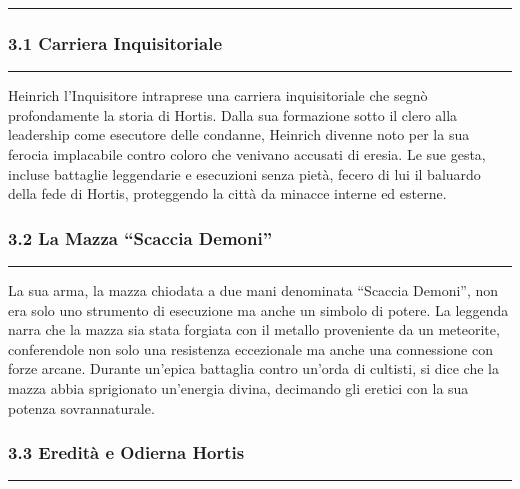 \begin{center}\rule{0.5\linewidth}{0.5pt}\end{center}

\subsubsection{\texorpdfstring{3.1 \textbf{Carriera
Inquisitoriale}}{3.1 Carriera Inquisitoriale}}\label{carriera-inquisitoriale}

\begin{center}\rule{0.5\linewidth}{0.5pt}\end{center}

Heinrich l'Inquisitore intraprese una carriera inquisitoriale che segnò
profondamente la storia di Hortis. Dalla sua formazione sotto il clero
alla leadership come esecutore delle condanne, Heinrich divenne noto per
la sua ferocia implacabile contro coloro che venivano accusati di
eresia. Le sue gesta, incluse battaglie leggendarie e esecuzioni senza
pietà, fecero di lui il baluardo della fede di Hortis, proteggendo la
città da minacce interne ed esterne.

\subsubsection{\texorpdfstring{3.2 \textbf{La Mazza ``Scaccia
Demoni''}}{3.2 La Mazza ``Scaccia Demoni''}}\label{la-mazza-scaccia-demoni}

\begin{center}\rule{0.5\linewidth}{0.5pt}\end{center}

La sua arma, la mazza chiodata a due mani denominata ``Scaccia Demoni'',
non era solo uno strumento di esecuzione ma anche un simbolo di potere.
La leggenda narra che la mazza sia stata forgiata con il metallo
proveniente da un meteorite, conferendole non solo una resistenza
eccezionale ma anche una connessione con forze arcane. Durante un'epica
battaglia contro un'orda di cultisti, si dice che la mazza abbia
sprigionato un'energia divina, decimando gli eretici con la sua potenza
sovrannaturale.

\subsubsection{\texorpdfstring{3.3 \textbf{Eredità e Odierna
Hortis}}{3.3 Eredità e Odierna Hortis}}\label{eredituxe0-e-odierna-hortis}

\begin{center}\rule{0.5\linewidth}{0.5pt}\end{center}

